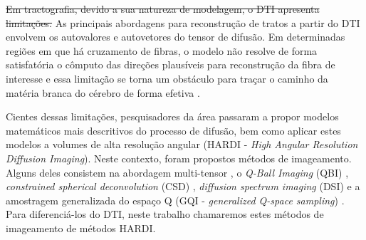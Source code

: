 \documentclass[
    12pt,                %
    oneside,            %
    a4paper,            %
    english,            %
    french,                %
    spanish,            %
    brazil                %
    ]{abntex2}
\begin{document}
%


\sout{Em tractografia, devido a sua natureza de modelagem, o DTI apresenta limitações.} As principais abordagens para reconstrução de tratos a partir do DTI envolvem os autovalores e autovetores do tensor de difusão. Em determinadas regiões em que há cruzamento de fibras, o modelo não resolve de forma satisfatória o cômputo das direções plausíveis para reconstrução da fibra de interesse e essa limitação se torna um obstáculo para traçar o caminho da matéria branca do cérebro de forma efetiva \cite{fillard2011, daducci2014}.



Cientes dessas limitações, pesquisadores da área passaram a propor modelos matemáticos mais descritivos do processo de difusão, bem como aplicar estes modelos a volumes de alta resolução angular  (HARDI - \textit{High Angular Resolution Diffusion Imaging}). Neste contexto, foram propostos métodos de imageamento. Alguns deles consistem na abordagem multi-tensor \cite{tuch2002}, o \textit{Q-Ball Imaging} (QBI) \cite{TuchQBall2004}, \textit{constrained spherical deconvolution} (CSD) \cite{tournier2007}, \textit{diffusion spectrum imaging} (DSI) \cite{wedeen2005} e a amostragem generalizada do espaço Q (GQI - \textit{generalized Q-space sampling}) \cite{yeh2010}. Para diferenciá-los do DTI, neste trabalho chamaremos estes métodos de imageamento de métodos HARDI.
\end{document}
